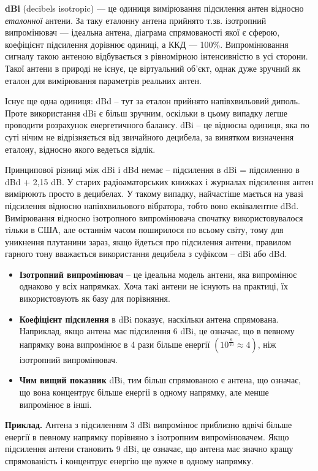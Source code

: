 \documentclass{article}
\begin{document}
\textbf{dBi} (decibels isotropic) --- це одиниця вимірювання підсилення антен відносно \textit{еталонної} антени. За таку еталонну антена прийнято т.зв. ізотропний випромінювач — ідеальна антена, діаграма спрямованості якої є сферою, коефіцієнт підсилення дорівнює одиниці, а ККД — 100\%. Випромінювання сигналу такою антеною відбувається з рівномірною інтенсивністю в усі сторони. Такої антени в природі не існує, це віртуальний об'єкт, однак дуже зручний як еталон для вимірювання параметрів реальних антен.

Існує ще одна одиниця: dBd -- тут за еталон прийнято напівхвильовий диполь. Проте використання dBi є більш зручним, оскільки в цьому випадку легше проводити розрахунок енергетичного балансу. dBi -- це відносна одиниця, яка по суті нічим не відрізняється від звичайного децибела, за винятком визначення еталону, відносно якого ведеться відлік.

Принципової різниці між dBi і dBd немає -- підсилення в dBi = підсиленню в dBd + 2,15 dB. У старих радіоаматорських книжках і журналах підсилення антен вимірюють просто в децибелах. У такому випадку, найчастіше мається на увазі підсилення відносно напівхвильового вібратора, тобто воно еквівалентне dBd. Вимірювання відносно ізотропного випромінювача спочатку використовувалося тільки в США, але останнім часом поширилося по всьому світу, тому для уникнення плутанини зараз, якщо йдеться про підсилення антени, правилом гарного тону вважається використання децибела з суфіксом -- dBi або dBd.


\begin{itemize}[noitemsep, topsep=8pt]
\item \textbf{Ізотропний випромінювач} -- це ідеальна модель антени, яка випромінює однаково у всіх напрямках. Хоча такі антени не існують на практиці, їх використовують як базу для порівняння.
\item \textbf{Коефіцієнт підсилення} в dBi показує, наскільки антена спрямована. Наприклад, якщо антена має підсилення 6 dBi, це означає, що в певному напрямку вона випромінює в 4 рази більше енергії $(10^{\frac{6}{10}} \approx 4)$, ніж ізотропний випромінювач.
\item \textbf{Чим вищий показник} dBi, тим більш спрямованою є антена, що означає, що вона концентрує більше енергії в одному напрямку, але менше випромінює в інші.
\end{itemize}


\textbf{Приклад.} Антена з підсиленням 3 dBi випромінює приблизно вдвічі більше енергії в певному напрямку порівняно з ізотропним випромінювачем. Якщо підсилення антени становить 9 dBi, це означає, що антена має значно кращу спрямованість і концентрує енергію ще вужче в одному напрямку.
\end{document}
